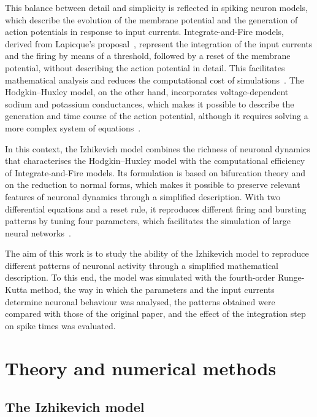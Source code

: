\documentclass[aps,pre,twocolumn,10pt,nofootinbib,floatfix]{revtex4-2}
\begin{document}
This balance between detail and simplicity is reflected in spiking neuron models, which
describe the evolution of the membrane potential and the generation of action potentials in
response to input currents. Integrate-and-Fire models, derived from Lapicque's
proposal~\cite{lapicque1907}, represent the integration of the input currents and the firing
by means of a threshold, followed by a reset of the membrane potential, without describing the
action potential in detail. This facilitates mathematical analysis and reduces the
computational cost of simulations~\cite{dayan2001}. The Hodgkin--Huxley model, on the other
hand, incorporates voltage-dependent sodium and potassium conductances, which makes it
possible to describe the generation and time course of the action potential, although it
requires solving a more complex system of equations~\cite{hodgkin1952}.

In this context, the Izhikevich model combines the richness of neuronal dynamics that
characterises the Hodgkin--Huxley model with the computational efficiency of
Integrate-and-Fire models. Its formulation is based on bifurcation theory and on the reduction
to normal forms, which makes it possible to preserve relevant features of neuronal dynamics
through a simplified description. With two differential equations and a reset rule, it
reproduces different firing and bursting patterns by tuning four parameters, which
facilitates the simulation of large neural networks~\cite{izhikevich2003}.

The aim of this work is to study the ability of the Izhikevich model to reproduce different
patterns of neuronal activity through a simplified mathematical description. To this end, the
model was simulated with the fourth-order Runge-Kutta method, the way in which the parameters
and the input currents determine neuronal behaviour was analysed, the patterns obtained were
compared with those of the original paper, and the effect of the integration step on spike
times was evaluated.

\section{Theory and numerical methods}

\subsection{The Izhikevich model}
\end{document}
